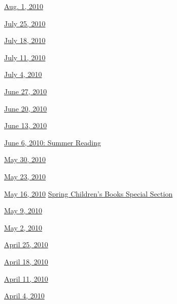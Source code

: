 \href{http://www.nytimes3xbfgragh.onion/indexes/2010/07/31/books/review/index.html}{Aug.
1, 2010}

\href{http://www.nytimes3xbfgragh.onion/indexes/2010/07/24/books/review/index.html}{July
25, 2010}

\href{http://www.nytimes3xbfgragh.onion/indexes/2010/07/17/books/review/index.html}{July
18, 2010}

\href{http://www.nytimes3xbfgragh.onion/indexes/2010/07/10/books/review/index.html}{July
11, 2010}

\href{http://www.nytimes3xbfgragh.onion/indexes/2010/07/03/books/review/index.html}{July
4, 2010}

\href{http://www.nytimes3xbfgragh.onion/indexes/2010/06/26/books/review/index.html}{June
27, 2010}

\href{http://www.nytimes3xbfgragh.onion/indexes/2010/06/19/books/review/index.html}{June
20, 2010}

\href{http://www.nytimes3xbfgragh.onion/indexes/2010/06/12/books/review/index.html}{June
13, 2010}

\href{http://www.nytimes3xbfgragh.onion/indexes/2010/06/05/books/review/index.html}{June
6, 2010: Summer Reading}

\href{http://www.nytimes3xbfgragh.onion/indexes/2010/05/29/books/review/index.html}{May
30, 2010}

\href{http://www.nytimes3xbfgragh.onion/indexes/2010/05/22/books/review/index.html}{May
23, 2010}

\href{http://www.nytimes3xbfgragh.onion/indexes/2010/05/15/books/review/index.html}{May
16, 2010} \textbar{}
\href{http://www.nytimes3xbfgragh.onion/indexes/2010/05/15/arts/artsspecial/index.html}{Spring
Children's Books Special Section}

\href{http://www.nytimes3xbfgragh.onion/indexes/2010/05/08/books/review/index.html}{May
9, 2010}

\href{http://www.nytimes3xbfgragh.onion/indexes/2010/05/01/books/review/index.html}{May
2, 2010}

\href{http://www.nytimes3xbfgragh.onion/indexes/2010/04/24/books/review/index.html}{April
25, 2010}

\href{http://www.nytimes3xbfgragh.onion/indexes/2010/04/17/books/review/index.html}{April
18, 2010}

\href{http://www.nytimes3xbfgragh.onion/indexes/2010/04/10/books/review/index.html}{April
11, 2010}

\href{http://www.nytimes3xbfgragh.onion/indexes/2010/04/03/books/review/index.html}{April
4, 2010}

